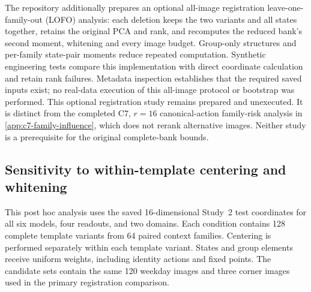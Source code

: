 The repository additionally prepares an optional all-image registration leave-one-family-out (LOFO) analysis: each deletion keeps the two variants and all states together, retains the original PCA and rank, and recomputes the reduced bank's second moment, whitening and every image budget. Group-only structures and per-family state-pair moments reduce repeated computation. Synthetic engineering tests compare this implementation with direct coordinate calculation and retain rank failures. Metadata inspection establishes that the required saved inputs exist; no real-data execution of this all-image protocol or bootstrap was performed. This optional registration study remains prepared and unexecuted. It is distinct from the completed C7, $r=16$ canonical-action family-risk analysis in \cref{app:c7-family-influence}, which does not rerank alternative images. Neither study is a prerequisite for the original complete-bank bounds.

\begin{table}[p]
\caption{C7 complete spectral margins, spread and original-tolerance rank intervals. U/T/B denotes unique leading/tied leading/behind. Full-precision CSV values and canonical image hashes are retained.}
\label{tab:bounded-cell-margins-c7}
\centering\small

\end{table}
\begin{table}[p]
\caption{D4 complete spectral margins, spread and original-tolerance rank intervals. These registered tasks have different target correspondences and do not provide exact-action risk rankings.}
\label{tab:bounded-cell-margins-d4}
\centering\small

\end{table}
\FloatBarrier

\subsection{Sensitivity to within-template centering and whitening}
\label{app:template-centering-sensitivity}

This post hoc analysis uses the saved 16-dimensional Study~2
test coordinates for all six models, four readouts, and two domains.
Each condition contains 128 complete template variants from
64 paired context families.
Centering is performed separately within each template variant.
States and group elements receive uniform weights,
including identity actions and fixed points.
The candidate sets contain the same 120 weekday images and
three corner images used in the primary registration comparison.

